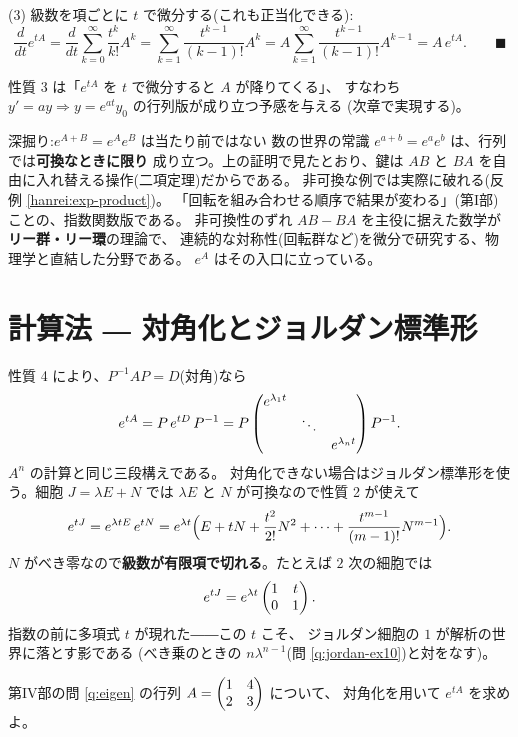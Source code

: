 (3) 級数を項ごとに $t$ で微分する(これも正当化できる):
\[
\frac{d}{dt}e^{tA} = \frac{d}{dt}\sum_{k=0}^{\infty} \frac{t^k}{k!}A^k
= \sum_{k=1}^{\infty} \frac{t^{k-1}}{(k-1)!}A^k
= A\sum_{k=1}^{\infty} \frac{t^{k-1}}{(k-1)!}A^{k-1} = A\,e^{tA}. \qquad\blacksquare
\]

性質 3 は「$e^{tA}$ を $t$ で微分すると $A$ が降りてくる」、
すなわち $y' = ay \Rightarrow y = e^{at}y_0$ の行列版が成り立つ予感を与える
(次章で実現する)。

\begin{itembox}[l]{深掘り:$e^{A+B} = e^{A}e^{B}$ は当たり前ではない}
数の世界の常識 $e^{a+b} = e^a e^b$ は、行列では\textbf{可換なときに限り}
成り立つ。上の証明で見たとおり、鍵は
$AB$ と $BA$ を自由に入れ替える操作(二項定理)だからである。
非可換な例では実際に破れる(反例 \ref{hanrei:exp-product})。
「回転を組み合わせる順序で結果が変わる」(第I部)ことの、指数関数版である。
非可換性のずれ $AB - BA$ を主役に据えた数学が\textbf{リー群・リー環}の理論で、
連続的な対称性(回転群など)を微分で研究する、物理学と直結した分野である。
$e^{A}$ はその入口に立っている。
\end{itembox}

\section{計算法 ― 対角化とジョルダン標準形}

性質 4 により、$P^{-1}AP = D$(対角)なら
\[
e^{tA} = P\,e^{tD}\,P^{-1}
= P \begin{pmatrix}e^{\lambda_1 t} & & \\ & \ddots & \\ & & e^{\lambda_n t}\end{pmatrix} P^{-1}.
\]
$A^n$ の計算と同じ三段構えである。
対角化できない場合はジョルダン標準形を使う。細胞
$J = \lambda E + N$ では $\lambda E$ と $N$ が可換なので性質 2 が使えて
\[
e^{tJ} = e^{\lambda t E}\,e^{tN}
= e^{\lambda t}\Bigl(E + tN + \frac{t^2}{2!}N^2 + \cdots
+ \frac{t^{m-1}}{(m-1)!}N^{m-1}\Bigr).
\]
$N$ がべき零なので\textbf{級数が有限項で切れる}。たとえば $2$ 次の細胞では
\[
e^{tJ} = e^{\lambda t}\begin{pmatrix}1 & t \\ 0 & 1\end{pmatrix}.
\]
指数の前に多項式 $t$ が現れた――この $t$ こそ、
ジョルダン細胞の $1$ が解析の世界に落とす影である
(べき乗のときの $n\lambda^{n-1}$(問 \ref{q:jordan-ex10})と対をなす)。

\begin{mondai}\label{q:exp}
第IV部の問 \ref{q:eigen} の行列 $A = \begin{pmatrix}1 & 4 \\ 2 & 3\end{pmatrix}$ について、
対角化を用いて $e^{tA}$ を求めよ。
\end{mondai}

